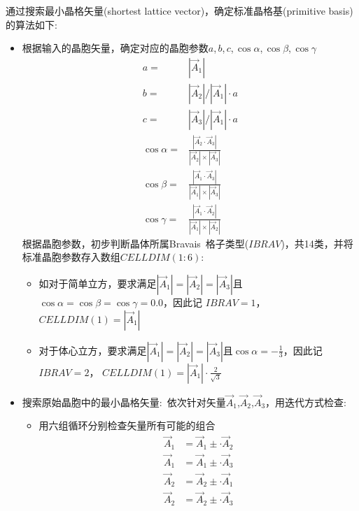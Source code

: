 通过搜索最小晶格矢量(\textrm{shortest lattice vector})，确定标准晶格基(\textrm{primitive basis})的算法如下:~
\begin{itemize}
	\item 根据输入的晶胞矢量，确定对应的晶胞参数$a$,\,$b$,\,$c$,\,$\cos\alpha$,\,$\cos\beta$,\,$\cos\gamma$
		\begin{displaymath}
			\begin{aligned}
			a=&|\vec A_1|\\
			b=&|\vec A_2|/|\vec A_1|\cdot a\\
			c=&|\vec A_3|/|\vec A_1|\cdot a\\
			\cos\alpha=&\frac{|\vec A_2\cdot\vec A_3|}{|\vec A_2|\times|\vec A_3|}\\
			\cos\beta=&\frac{|\vec A_1\cdot\vec A_3|}{|\vec A_1|\times|\vec A_3|}\\
			\cos\gamma=&\frac{|\vec A_1\cdot\vec A_2|}{|\vec A_1|\times|\vec A_2|}
			\end{aligned}
			\label{eq:Cell_DM}
		\end{displaymath}
根据晶胞参数，初步判断晶体所属\textrm{Bravais~}格子类型($\mathit{IBRAV}$)，共14类，并将标准晶胞参数存入数组$\mathit{CELLDIM}(1:6)$:~
\begin{itemize}
	\item 如对于简单立方，要求满足$|\vec A_1|=|\vec A_2|=|\vec A_3|$且$\cos\alpha=\cos\beta=\cos\gamma=0.0$，因此记
				$\mathit{IBRAV}=1$，
				$\mathit{CELLDIM}(1)=|\vec A_1|$
	\item 对于体心立方，要求满足$|\vec A_1|=|\vec A_2|=|\vec A_3|$且$\cos\alpha=-\frac13$，因此记
				$\mathit{IBRAV}=2$，
				$\mathit{CELLDIM}(1)=|\vec A_1|\cdot\frac2{\sqrt3}$
\end{itemize}
	\item 搜索原始晶胞中的最小晶格矢量:~依次针对矢量$\vec A_1$,$\vec A_2$,$\vec A_3$，用迭代方式检查:~
		\begin{itemize}
			\item 用六组循环分别检查矢量所有可能的组合
				\begin{displaymath}
					\begin{aligned}
						\vec A_1&=\vec A_1\pm\cdot\vec A_2\\
						\vec A_1&=\vec A_1\pm\cdot\vec A_3\\
						\vec A_2&=\vec A_2\pm\cdot\vec A_1\\
						\vec A_2&=\vec A_2\pm\cdot\vec A_3\\

\end{aligned}
\end{displaymath}
\end{itemize}
\end{itemize}
